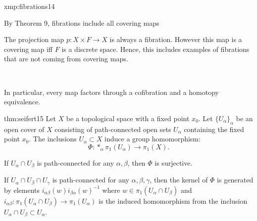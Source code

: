 \documentclass[landscape, 8pt]{extarticle}
\begin{document}
\begin{multicols*}{3}
\begin{xmp}{xmp:fibrations}{14}
	\begin{enumerate-zero}
	    \item By Theorem 9, fibrations include all covering maps
	    \item The projection map $p : X \times F \to X$ is always a fibration. However this map is a covering map iff $F$ is a discrete space. Hence, this includes examples of fibrations that are not coming from covering maps.
	    \item $ $\newline\vspace{-23pt}
			{
			}
	\end{enumerate-zero}
	In particular, every map factors through a cofibration and a homotopy equivalence.
\end{xmp}

\begin{thm}{thm:seifert}{15}
	Let $X$ be a topological space with a fixed point $x_{0}$. Let $\{U_{\alpha}\}_{\alpha}$ be an open cover of $X$ consisting of path-connected open sets $U_{\alpha}$ containing the fixed point $x_{0}$. The inclusions $U_{\alpha} \subset X$ induce a group homomorphism:
	\[\Phi : \ast_{\alpha} \pi_{1}(U_{\alpha}) \to \pi_{1}(X).\]
	\begin{enumerate-zero}
	    \item If $U_{\alpha} \cap U_{\beta}$ is path-connected for any $\alpha, \beta$, then $\Phi$ is surjective.
	    \item If $U_{\alpha} \cap U_{\beta} \cap U_{\gamma}$ is path-connected for any $\alpha, \beta, \gamma$, then the kernel of $\Phi$ is generated by elements $i_{\alpha\beta}(w) i_{\beta\alpha}(w)^{-1}$ where $w \in \pi_{1}(U_{\alpha} \cap U_{\beta})$ and $i_{\alpha\beta} : \pi_{1}(U_{\alpha} \cap U_{\beta}) \to \pi_{1}(U_{\alpha})$ is the induced homomorphism from the inclusion $U_{\alpha} \cap U_{\beta} \subset U_{\alpha}$.
	\end{enumerate-zero}


\end{thm}
\end{multicols*}
\end{document}
